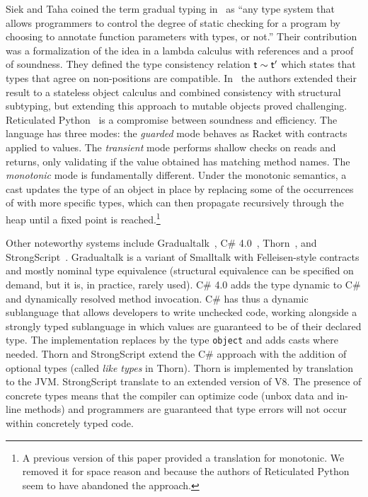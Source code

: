 \documentclass[a4paper,USenglish]{tex/lipics-v2016}
\begin{document}
Siek and Taha coined the term gradual typing in~\cite{SiekTaha06} as ``any
type system that allows programmers to control the degree of static checking
for a program by choosing to annotate function parameters with types, or
not.'' Their contribution was a formalization of the idea in a lambda
calculus with references and a proof of soundness. They defined the type
consistency relation $\t \sim \tp$ which states that types that agree on
non-\any positions are compatible.  In~\cite{SiekTaha07} the authors
extended their result to a stateless object calculus and combined
consistency with structural subtyping, but extending this approach to
mutable objects proved challenging.  Reticulated Python~\cite{siek14} is a
compromise between soundness and efficiency.  The language has three modes:
the \emph{guarded} mode behaves as Racket with contracts applied to values.
The \emph{transient} mode performs shallow checks on reads and returns, only
validating if the value obtained has matching method names.  The
\emph{monotonic} mode is fundamentally different. Under the monotonic
semantics, a cast updates the type of an object in place by replacing some
of the occurrences of \any with more specific types, which can then
propagate recursively through the heap until a fixed point is
reached.\footnote{A previous version of this paper provided a translation
  for monotonic. We removed it for space reason and because the authors
  of Reticulated Python seem to have abandoned the approach.}

Other noteworthy systems include Gradualtalk~\cite{GS13}, C\#
4.0~\cite{Bierman10}, Thorn~\cite{oopsla09}, and
StrongScript~\cite{ecoop15}. Gradualtalk is a variant of Smalltalk with
Felleisen-style contracts and mostly nominal type equivalence (structural
equivalence can be specified on demand, but it is, in practice, rarely
used). C\# 4.0 adds the type {\sf dynamic} to C\# and dynamically resolved
method invocation.  C\# has thus a dynamic sublanguage that allows
developers to write unchecked code, working alongside a strongly typed
sublanguage in which values are guaranteed to be of their declared type.
The implementation replaces \any by the type {\tt object} and adds casts
where needed.  Thorn and StrongScript extend the C\# approach with the
addition of optional types (called {\em like types} in Thorn).  Thorn is
implemented by translation to the JVM. StrongScript translate to an extended
version of V8. The presence of concrete types means that the compiler can
optimize code (unbox data and in-line methods) and programmers are
guaranteed that type errors will not occur within concretely typed code.
\end{document}
